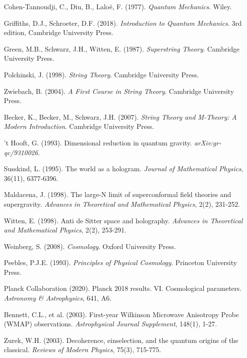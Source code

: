 \documentclass[12pt]{article}
\theoremstyle{plain}
\theoremstyle{definition}
\begin{document}
\begin{thebibliography}{99}
 Cohen-Tannoudji, C., Diu, B., Laloë, F. (1977). \emph{Quantum Mechanics}. Wiley.

 Griffiths, D.J., Schroeter, D.F. (2018). \emph{Introduction to Quantum Mechanics}. 3rd edition, Cambridge University Press.

 Green, M.B., Schwarz, J.H., Witten, E. (1987). \emph{Superstring Theory}. Cambridge University Press.

 Polchinski, J. (1998). \emph{String Theory}. Cambridge University Press.

 Zwiebach, B. (2004). \emph{A First Course in String Theory}. Cambridge University Press.

 Becker, K., Becker, M., Schwarz, J.H. (2007). \emph{String Theory and M-Theory: A Modern Introduction}. Cambridge University Press.

 't Hooft, G. (1993). Dimensional reduction in quantum gravity. \emph{arXiv:gr-qc/9310026}.

 Susskind, L. (1995). The world as a hologram. \emph{Journal of Mathematical Physics}, 36(11), 6377-6396.

 Maldacena, J. (1998). The large-N limit of superconformal field theories and supergravity. \emph{Advances in Theoretical and Mathematical Physics}, 2(2), 231-252.

 Witten, E. (1998). Anti de Sitter space and holography. \emph{Advances in Theoretical and Mathematical Physics}, 2(2), 253-291.

 Weinberg, S. (2008). \emph{Cosmology}. Oxford University Press.

 Peebles, P.J.E. (1993). \emph{Principles of Physical Cosmology}. Princeton University Press.

 Planck Collaboration (2020). Planck 2018 results. VI. Cosmological parameters. \emph{Astronomy \& Astrophysics}, 641, A6.

 Bennett, C.L., et al. (2003). First-year Wilkinson Microwave Anisotropy Probe (WMAP) observations. \emph{Astrophysical Journal Supplement}, 148(1), 1-27.

 Zurek, W.H. (2003). Decoherence, einselection, and the quantum origins of the classical. \emph{Reviews of Modern Physics}, 75(3), 715-775.


\end{thebibliography}
\end{document}
